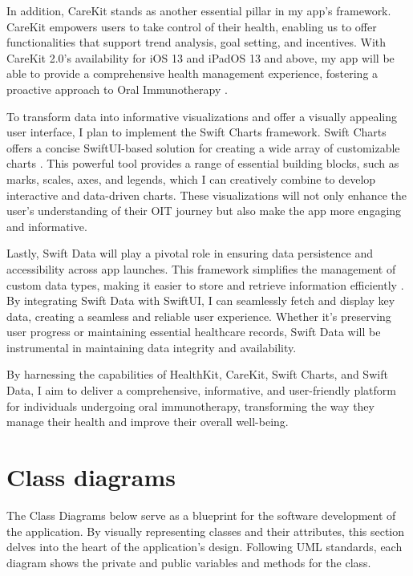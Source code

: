 In addition, CareKit stands as another essential pillar in my app's framework. CareKit empowers users to take control of their health, enabling us to offer functionalities that support trend analysis, goal setting, and incentives. With CareKit 2.0's availability for iOS 13 and iPadOS 13 and above, my app will be able to provide a comprehensive health management experience, fostering a proactive approach to Oral Immunotherapy \cite{CareKit}.

To transform data into informative visualizations and offer a visually appealing user interface, I plan to implement the Swift Charts framework. Swift Charts offers a concise SwiftUI-based solution for creating a wide array of customizable charts \cite{SwiftCharts}. This powerful tool provides a range of essential building blocks, such as marks, scales, axes, and legends, which I can creatively combine to develop interactive and data-driven charts. These visualizations will not only enhance the user's understanding of their OIT journey but also make the app more engaging and informative.

Lastly, Swift Data will play a pivotal role in ensuring data persistence and accessibility across app launches. This framework simplifies the management of custom data types, making it easier to store and retrieve information efficiently \cite{SwiftData}. By integrating Swift Data with SwiftUI, I can seamlessly fetch and display key data, creating a seamless and reliable user experience. Whether it's preserving user progress or maintaining essential healthcare records, Swift Data will be instrumental in maintaining data integrity and availability.

By harnessing the capabilities of HealthKit, CareKit, Swift Charts, and Swift Data, I aim to deliver a comprehensive, informative, and user-friendly platform for individuals undergoing oral immunotherapy, transforming the way they manage their health and improve their overall well-being.

\section{Class diagrams}

The Class Diagrams below serve as a blueprint for the software development of the application. By visually representing classes and their attributes, this section delves into the heart of the application's design. Following UML standards, each diagram shows the private and public variables and methods for the class.

